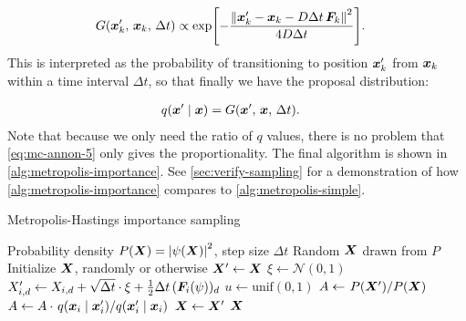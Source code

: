 \documentclass[Thesis.tex]{subfiles}
\begin{document}
\begin{align}
  \label{eq:mc-annon-5}
  G\qty(\bm{x}_k', \,\bm{x}_k,\,\Delta t) &\propto \exp[-\frac{\norm{\bm{x}_k' - \bm{x}_k - D\Delta t\,\bm{F}_k}^2}{4D\Delta t}].
\end{align}
This is interpreted as the probability of transitioning to position $\bm{x}_k'$
from $\bm{x}_k$ within a time interval $\Delta t$, so that finally we have the
proposal distribution:

\begin{align}
  q\qty(\bm{x}'\;\middle|\;\bm{x}) &=G\qty(\bm{x}', \,\bm{x},\,\Delta t).
\end{align}
Note that because we only need the ratio of $q$ values, there is no problem
that \cref{eq:mc-annon-5} only gives the proportionality. The final algorithm is
shown in \cref{alg:metropolis-importance}.
See \cref{sec:verify-sampling} for a demonstration of how
\cref{alg:metropolis-importance} compares to \cref{alg:metropolis-simple}.

\begin{algorithm}[h]
    \caption{Metropolis-Hastings importance sampling}
    \label{alg:metropolis-importance}
    \begin{algorithmic}[1]
        \Require Probability density $P(\bm{X}) = \abs{\psi(\bm{X})}^2$, step size $\Delta t$
        \Ensure Random $\bm{X}$ drawn from $P$
        \State Initialize $\bm{X}$, randomly or otherwise
        \Repeat
            \State $\bm{X}'\gets \bm{X}$
              \State $\xi\gets \mathcal{N}(0, 1)$
              \State $X_{i,d}'\gets X_{i,d} + \sqrt{\Delta t} \cdot \xi +
              \frac{1}{2}\Delta t\,(\bm{F}_i(\psi))_d$
            \EndFor
            \State $u\gets\text{unif}(0, 1)$
            \State $A\gets \flatfrac{P\qty(\vX')}{P\qty(\vX)}$
            \State $A\gets A\cdot \flatfrac{q\qty(\vx_i\;\middle|\;\vx_i')}{q\qty(\vx_i'\;\middle|\;\vx_i)}$
              \State $\bm{X} \gets \bm{X}'$
            \EndIf
            \State \Yield $\bm{X}$
          \EndFor
    \end{algorithmic}
\end{algorithm}
\end{document}
